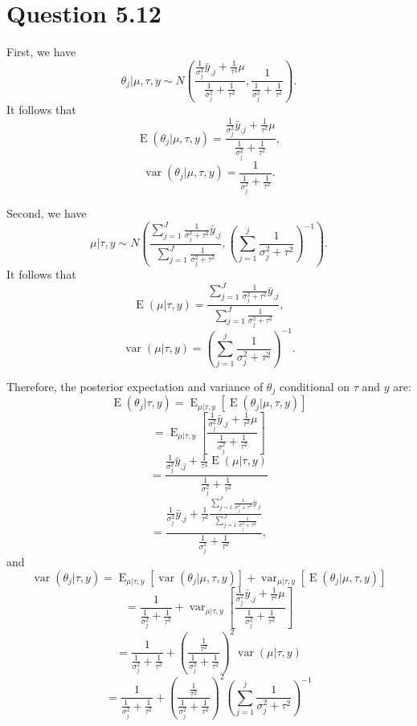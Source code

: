 \documentclass{article}
\DeclareMathOperator*{\var}{var}
\DeclareMathOperator*{\expec}{E}
\begin{document}
\section*{Question 5.12}
{
    First, we have
    $$\theta_j | \mu, \tau, y \sim N( \frac{\frac{1}{\sigma_j^2} \bar{y}_{.j} + \frac{1}{\tau^2} \mu}{\frac{1}{\sigma_j^2} + \frac{1}{\tau^2}}, \frac{1}{\frac{1}{\sigma_j^2} + \frac{1}{\tau^2}}).$$
    It follows that $$\expec{(\theta_j | \mu, \tau, y)} = \frac{\frac{1}{\sigma_j^2} \bar{y}_{.j} + \frac{1}{\tau^2} \mu}{\frac{1}{\sigma_j^2} + \frac{1}{\tau^2}},$$
    $$\var{(\theta_j | \mu, \tau, y)} = \frac{1}{\frac{1}{\sigma_j^2} + \frac{1}{\tau^2}}.$$

    Second, we have
    $$\mu | \tau, y \sim N( \frac{\sum_{j=1}^{J}{\frac{1}{\sigma_j^2+\tau^2} \bar{y}_{.j}}}{\sum_{j=1}^{J}{\frac{1}{\sigma_j^2+\tau^2}}}, \left( \sum_{j=1}^{j}{\frac{1}{\sigma_j^2+\tau^2}} \right)^{-1} ).$$
    It follows that $$\expec{(\mu | \tau, y)} = \frac{\sum_{j=1}^{J}{\frac{1}{\sigma_j^2+\tau^2} \bar{y}_{.j}}}{\sum_{j=1}^{J}{\frac{1}{\sigma_j^2+\tau^2}}},$$
    $$\var{(\mu | \tau, y)} = (\sum_{j=1}^{j}{\frac{1}{\sigma_j^2+\tau^2}})^{-1}.$$

    Therefore, the posterior expectation and variance of $\theta_j$ conditional on $\tau$ and $y$ are:
    $$\expec{(\theta_j | \tau, y)} = \expec_{\mu | \tau, y}{\left[ \expec{(\theta_j | \mu, \tau, y)} \right]} $$
    $$= \expec_{\mu | \tau, y}{\left[ \frac{\frac{1}{\sigma_j^2} \bar{y}_{.j} + \frac{1}{\tau^2} \mu}{\frac{1}{\sigma_j^2} + \frac{1}{\tau^2}} \right]}$$
    $$= \frac{\frac{1}{\sigma_j^2} \bar{y}_{.j} + \frac{1}{\tau^2} \expec{(\mu | \tau, y)}}{\frac{1}{\sigma_j^2} + \frac{1}{\tau^2}}$$
    $$= \frac{\frac{1}{\sigma_j^2} \bar{y}_{.j} + \frac{1}{\tau^2} \frac{\sum_{j=1}^{J}{\frac{1}{\sigma_j^2+\tau^2} \bar{y}_{.j}}}{\sum_{j=1}^{J}{\frac{1}{\sigma_j^2+\tau^2}}}}{\frac{1}{\sigma_j^2} + \frac{1}{\tau^2}},$$
    and
    $$\var{(\theta_j | \tau, y)} = \expec_{\mu | \tau, y}{\left[ \var{(\theta_j | \mu, \tau, y)} \right]} + \var_{\mu | \tau, y}{\left[ \expec{(\theta_j | \mu, \tau, y)} \right]}$$
    $$= \frac{1}{\frac{1}{\sigma_j^2} + \frac{1}{\tau^2}} + \var_{\mu | \tau, y}{\left[ \frac{\frac{1}{\sigma_j^2} \bar{y}_{.j} + \frac{1}{\tau^2} \mu}{\frac{1}{\sigma_j^2} + \frac{1}{\tau^2}} \right]}$$
    $$= \frac{1}{\frac{1}{\sigma_j^2} + \frac{1}{\tau^2}} + \left( \frac{\frac{1}{\tau^2}}{\frac{1}{\sigma_j^2} + \frac{1}{\tau^2}} \right)^2 \var{(\mu | \tau, y)}$$
    $$= \frac{1}{\frac{1}{\sigma_j^2} + \frac{1}{\tau^2}} + \left( \frac{\frac{1}{\tau^2}}{\frac{1}{\sigma_j^2} + \frac{1}{\tau^2}} \right)^2 (\sum_{j=1}^{j}{\frac{1}{\sigma_j^2+\tau^2}})^{-1}$$

}
\end{document}
